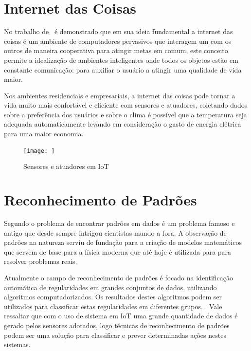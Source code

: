 \section{Internet das Coisas}

No trabalho de~ é demonstrado que em sua ideia fundamental a internet das coisas é um ambiente de computadores pervasivos que interagem um com os outros de maneira cooperativa para atingir metas em comum, este conceito permite a idealização de ambientes inteligentes onde todos os objetos estão em constante comunicação: para auxiliar o usuário a atingir uma qualidade de vida maior.

Nos ambientes residenciais e empresariais, a internet das coisas pode tornar a vida muito mais confortável e eficiente com sensores e atuadores, coletando dados sobre a preferência dos usuários e sobre o clima é possível que a temperatura seja adequada automaticamente levando em consideração o gasto de energia elétrica para uma maior economia. \cite{ATZORI:2010}

\begin{figure}
    \centering
    \texttt{[image: ]}
    \caption{Sensores e atuadores em IoT}
    \label{fig:my_label}
\end{figure}


\section{Reconhecimento de Padrões}

Segundo  o problema de encontrar padrões em dados é um problema famoso e antigo que desde sempre intrigou cientistas mundo a fora. A observação de padrões na natureza serviu de fundação para a criação de modelos matemáticos que servem de base para a física moderna que até hoje é utilizada para para resolver problemas reais. 

Atualmente o campo de reconhecimento de padrões é focado na identificação automática de regularidades em grandes conjuntos de dados, utilizando algoritmos computadorizados. Os resultados destes algoritmos podem ser utilizados para classificar estas regularidades em diferentes grupos. \cite{bishop:2006}. Vale ressaltar que com o uso de sistema em IoT uma grande quantidade de dados é gerado pelos sensores adotados, logo técnicas de reconhecimento de padrões podem ser uma solução para classificar e prever determinadas ações nestes sistemas.

